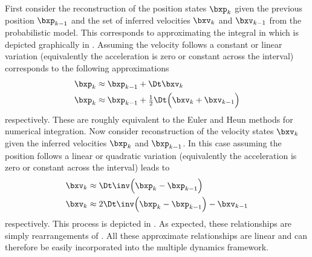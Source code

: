 First consider the reconstruction of the position states $\bxp_k$ given the previous position $\bxp_{k-1}$ and the set of inferred velocities $\bxv_k$ and $\bxv_{k-1}$ from the probabilistic model. This corresponds to approximating the integral in  which is depicted graphically in . Assuming the velocity follows a constant or linear variation (equivalently the acceleration is zero or constant across the interval) corresponds to the following approximations
\begin{align}
\bxp_k &\approx \bxp_{k-1} + \Dt\bxv_k \label{eqn:int1} \\
\bxp_k &\approx \bxp_{k-1} + \tfrac{1}{2} \Dt \Big( \bxv_k + \bxv_{k-1} \Big) \label{eqn:int2}
\end{align}
respectively. These are roughly equivalent to the Euler and Heun methods for numerical integration. Now consider reconstruction of the velocity states $\bxv_k$ given the inferred velocities $\bxp_k$ and $\bxp_{k-1}$. In this case assuming the position follows a linear or quadratic variation (equivalently the acceleration is zero or constant across the interval) leads to
\begin{align}
\bxv_k &\approx \Dt\inv \Big( \bxp_k - \bxp_{k-1} \Big) \label{eqn:diff1} \\
\bxv_k &\approx 2 \Dt\inv \Big( \bxp_k - \bxp_{k-1} \Big) - \bxv_{k-1} \label{eqn:diff2}
\end{align}
respectively. This process is depicted in . As expected, these relationships are simply rearrangements of . All these approximate relationships are linear and can therefore be easily incorporated into the multiple dynamics framework.







